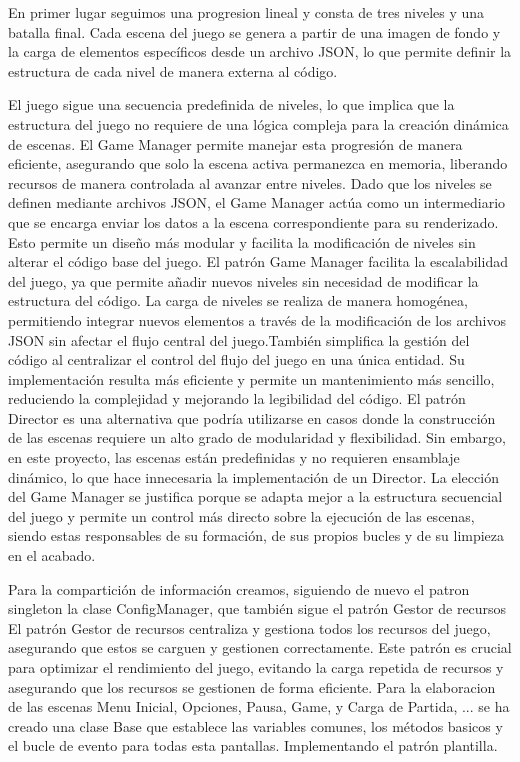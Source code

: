\documentclass[12pt,a4paper,twoside,spanish]{article}      %
\begin{document}
En primer lugar seguimos una progresion lineal y consta de tres niveles y una batalla final. Cada escena del juego se genera a partir de una imagen de fondo y la carga de elementos específicos desde un archivo JSON, lo que permite definir la estructura de cada nivel de manera externa al código.

El juego sigue una secuencia predefinida de niveles, lo que implica que la estructura del juego no requiere de una lógica compleja para la creación dinámica de escenas. El Game Manager permite manejar esta progresión de manera eficiente, asegurando que solo la escena activa permanezca en memoria, liberando recursos de manera controlada al avanzar entre niveles.
Dado que los niveles se definen mediante archivos JSON, el Game Manager actúa como un intermediario que se encarga enviar los datos a la escena correspondiente para su renderizado. Esto permite un diseño más modular y facilita la modificación de niveles sin alterar el código base del juego.
El patrón Game Manager facilita la escalabilidad del juego, ya que permite añadir nuevos niveles sin necesidad de modificar la estructura del código. La carga de niveles se realiza de manera homogénea, permitiendo integrar nuevos elementos a través de la modificación de los archivos JSON sin afectar el flujo central del juego.También simplifica la gestión del código al centralizar el control del flujo del juego en una única entidad. Su implementación resulta más eficiente y permite un mantenimiento más sencillo, reduciendo la complejidad y mejorando la legibilidad del código.
El patrón Director es una alternativa que podría utilizarse en casos donde la construcción de las escenas requiere un alto grado de modularidad y flexibilidad. Sin embargo, en este proyecto, las escenas están predefinidas y no requieren ensamblaje dinámico, lo que hace innecesaria la implementación de un Director. La elección del Game Manager se justifica porque se adapta mejor a la estructura secuencial del juego y permite un control más directo sobre la ejecución de las escenas, siendo estas responsables de su formación, de sus propios bucles y de su limpieza en el acabado.

Para la compartición de información creamos, siguiendo de nuevo el patron singleton la clase ConfigManager, que también sigue el patrón Gestor de recursos 
El patrón Gestor de recursos centraliza y gestiona todos los recursos del juego, asegurando que estos se carguen y gestionen correctamente.
Este patrón es crucial para optimizar el rendimiento del juego, evitando la carga repetida de recursos y asegurando que los recursos se gestionen de forma eficiente.
Para la elaboracion de las escenas Menu Inicial, Opciones, Pausa, Game, y Carga de Partida, ... se ha creado una clase Base que  establece las variables comunes, los métodos basicos y el bucle de evento para todas esta pantallas. Implementando el patrón plantilla.
\end{document}
